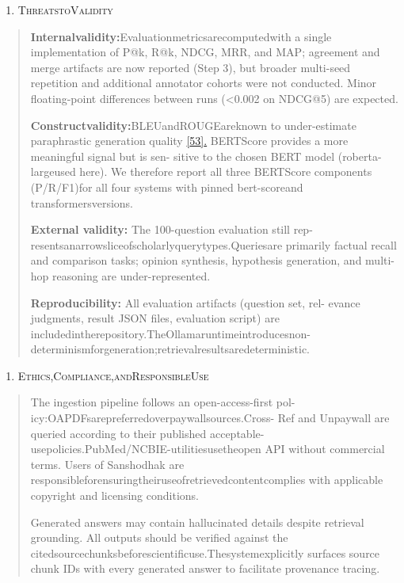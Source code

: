 \documentclass[
]{article}
\begin{document}
\begin{enumerate}
\def\labelenumi{\Roman{enumi}.}
\setcounter{enumi}{7}
\item
  \protect{}\label{Threats_to_Validity}{}\textsc{ThreatstoValidity}
\end{enumerate}

\begin{quote}
\textbf{Internalvalidity:}Evaluationmetricsarecomputedwith a single implementation of P@k, R@k, NDCG, MRR, and MAP; agreement and merge artifacts are now reported (Step 3), but broader multi-seed repetition and additional annotator cohorts were not conducted. Minor floating-point differences between runs (\textless0.002 on NDCG@5) are expected.

\textbf{Constructvalidity:}BLEUandROUGEareknown to under-estimate paraphrastic generation quality \hyperref[_bookmark61]{{[}53{]}.} BERTScore provides a more meaningful signal but is sen- sitive to the chosen BERT model (roberta-largeused here). We therefore report all three BERTScore components (P/R/F1)for all four systems with pinned bert-scoreand transformersversions.

\textbf{External validity:} The 100-question evaluation still rep- resentsanarrowsliceofscholarlyquerytypes.Queriesare primarily factual recall and comparison tasks; opinion synthesis, hypothesis generation, and multi-hop reasoning are under-represented.

\textbf{Reproducibility:} All evaluation artifacts (question set, rel- evance judgments, result JSON files, evaluation script) are includedintherepository.TheOllamaruntimeintroducesnon- determinismforgeneration;retrievalresultsaredeterministic.
\end{quote}

\begin{enumerate}
\def\labelenumi{\Roman{enumi}.}
\setcounter{enumi}{8}
\item
  \protect{}\label{Ethicsux2c_Complianceux2c_and_Responsible_Use}{}\textsc{Ethics,Compliance,andResponsibleUse}
\end{enumerate}

\begin{quote}
The ingestion pipeline follows an open-access-first pol-icy:OAPDFsarepreferredoverpaywallsources.Cross- Ref and Unpaywall are queried according to their published acceptable-usepolicies.PubMed/NCBIE-utilitiesusetheopen API without commercial terms. Users of Sanshodhak are responsibleforensuringtheiruseofretrievedcontentcomplies with applicable copyright and licensing conditions.

Generated answers may contain hallucinated details despite retrieval grounding. All outputs should be verified against the citedsourcechunksbeforescientificuse.Thesystemexplicitly surfaces source chunk IDs with every generated answer to facilitate provenance tracing.
\end{quote}
\end{document}
